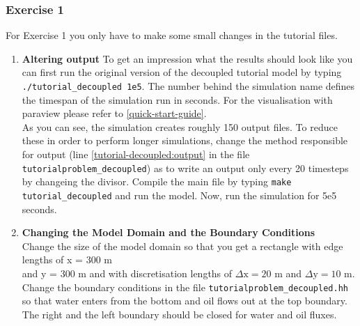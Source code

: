 \subsubsection{Exercise 1}
\renewcommand{\labelenumi}{\alph{enumi})}
For Exercise 1 you only have to make some small changes in the tutorial files.
\begin{enumerate}
\item \textbf{Altering output}
To get an impression what the results should look like you can first run the original version of the decoupled tutorial model by typing  \texttt{./tutorial\_decoupled 1e5}. The number behind the simulation name defines the timespan of the simulation run in seconds. For the visualisation with paraview please refer to \ref{quick-start-guide}.\\
As you can see, the simulation creates roughly 150 output files. To reduce these in order to perform longer simulations, change the method responsible for output (line \ref{tutorial-decoupled:output} in the file \texttt{tutorialproblem\_decoupled}) as to write an output only every 20 timesteps by changeing the divisor. Compile the main file by typing \texttt{make tutorial\_decoupled} and run the model. Now, run the simulation for 5e5 seconds.

\item \textbf{Changing the Model Domain and the Boundary Conditions} \\
Change the size of the model domain so that you get a rectangle
with edge lengths of x = 300 m \\  and y = 300 m and with discretisation lengths of  $\Delta \text{x} = 20$ m and $\Delta \text{y} = 10$ m. \\
Change the boundary conditions in the file \texttt{tutorialproblem\_decoupled.hh} so that water enters from the bottom and oil flows out at the top boundary. The right and the left boundary should be closed for water and oil fluxes.  \\


\end{enumerate}
